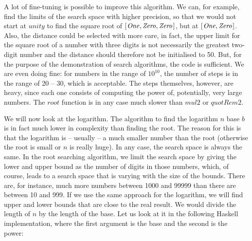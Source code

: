 \documentclass{scrreprt}
\newcommand{\Conid}[1]{\mathit{#1}}
\newcommand{\Varid}[1]{\mathit{#1}}
\begin{document}
A lot of fine-tuning is possible to improve
this algorithm.
We can, for example, find the limits 
of the search space with higher precision,
so that we would not start at \ensuremath{\Varid{unity}} to find the
square root of \ensuremath{[\mskip1.5mu \Conid{One},\Conid{Zero},\Conid{Zero}\mskip1.5mu]}, but at \ensuremath{[\mskip1.5mu \Conid{One},\Conid{Zero}\mskip1.5mu]}.
Also, the distance could be selected with more care,
in fact, the upper limit for the square root of 
a number with three digits is not necessarily
the greatest two-digit number and the distance
should therefore not be initialised to 50.
But, for the purpose of the demonstration 
of search algorithms, the code is sufficient.
We are even doing fine:
for numbers in the range of $10^{10}$,
the number of steps is in the range of 20 -- 30,
which is acceptable.
The steps themselves, however, are heavy,
since each one consists of computing the power
of, potentially, very large numbers.
The \ensuremath{\Varid{root}} function is in any case
much slower than \ensuremath{\Varid{mul2}} or \ensuremath{\Varid{quotRem2}}.

We will now look at the logarithm.
The algorithm to find the logarithm \ensuremath{\Varid{n}} base \ensuremath{\Varid{b}}
is in fact much lower in complexity
than finding the root.
The reason for this is that 
the logarithm is -- usually -- a much smaller number
than the root (otherwise the root is small
or \ensuremath{\Varid{n}} is really huge).
In any case, the search space is always the same.
In the root searching algorithm,
we limit the search space by giving
the lower and upper bound as the number of digits
in those numbers,
which, of course, leads to a search space
that is varying with the size of the bounds.
There are, for instance, much more numbers
between \num{1000} and \num{99999} than there are
between \num{10} and \num{999}.
If we use the same approach for the logarithm,
we will find upper and lower bounds 
that are close to the real result.
We would divide the length of \ensuremath{\Varid{n}} by the length
of the base. 
Let us look at it in the following Haskell implementation,
where the first argument is the base and the second
is the power:
\end{document}
